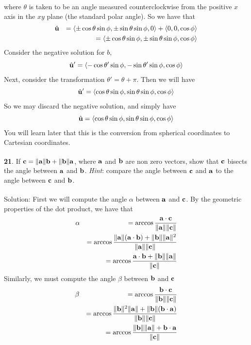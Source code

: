 \documentclass[12pt]{amsbook}
\newcommand{\la}{\langle}
\newcommand{\ra}{\rangle}
\begin{document}
where $\theta$ is taken to be an angle measured counterclockwise from the positive $x$ axis in the $xy$ plane (the standard polar angle). So we have that \begin{eqnarray*}
\hat{\bf u}&&=\la \pm \cos\theta\sin\phi, \pm \sin\theta\sin\phi, 0 \ra + \la 0,0,\cos\phi \ra \\
&&= \la \pm \cos\theta\sin\phi, \pm \sin\theta\sin\phi, \cos\phi \ra
\end{eqnarray*}
Consider the negative solution for $b$, 
$$\hat{\bf u}'=\la -\cos\theta'\sin\phi, -\sin\theta'\sin\phi, \cos\phi \ra$$
Next, consider the transformation $\theta'=\theta + \pi$. Then we will have 
$$\hat{\bf u}'=\la \cos\theta\sin\phi, \sin\theta\sin\phi, \cos\phi \ra$$
So we may discard the negative solution, and simply have 
$$\hat{\bf u}=\la \cos\theta\sin\phi,\sin\theta\sin\phi, \cos\phi \ra$$
You will learn later that this is the conversion from spherical coordinates to Cartesian coordinates.
\\
\\
{\small\bf 21}. If ${\bf c}=\|{\bf a}\| {\bf b} + \|{\bf b}\|{\bf a}$,
where ${\bf a}$ and ${\bf b}$ are non zero vectors, show that
${\bf c}$ bisects the angle between ${\bf a}$ and ${\bf b}$. {\it Hint}:
compare the angle
between ${\bf c}$ and ${\bf a}$ to the angle between ${\bf c}$ and
  ${\bf b}$.\\
\\
{\sc Solution}:
First we will compute the angle $\alpha$ between $\bf a$ and $\bf c$. By the geometric properties of the dot product, we have that
\begin{eqnarray*}
\alpha &&= \arccos\frac{{\bf a}\cdot{\bf c}}{\|{\bf a}\|\|{\bf c}\|}\\
&&= \arccos\frac{\|{\bf a}\|({\bf a}\cdot{\bf b})+\|{\bf b}\|\|{\bf a}\|^2}{\|{\bf a}\|\|{\bf c}\|}\\
&&= \arccos\frac{{\bf a}\cdot{\bf b}+\|{\bf b}\|\|{\bf a}\|}{\|{\bf c}\|}\\
\end{eqnarray*}
Similarly, we must compute the angle $\beta$ between $\bf b$ and $\bf c$
\begin{eqnarray*}
\beta &&= \arccos\frac{{\bf b}\cdot{\bf c}}{\|{\bf b}\|\|{\bf c}\|}\\
&&= \arccos\frac{\|{\bf b}\|^2\|{\bf a}\|+\|{\bf b}\|({\bf b}\cdot{\bf a})}{\|{\bf b}\|\|{\bf c}\|}\\
&&= \arccos\frac{\|{\bf b}\|\|{\bf a}\|+{\bf b}\cdot{\bf a}}{\|{\bf c}\|}\\
\end{eqnarray*}
\end{document}
